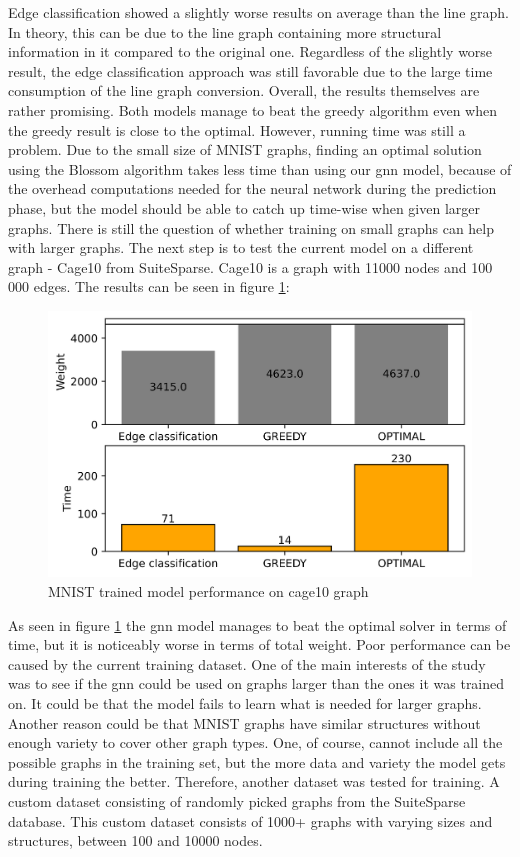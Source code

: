 Edge classification showed a slightly worse results on average than the line graph. In theory, this can be due to the line graph containing more structural information in it compared to the original one. Regardless of the slightly worse result, the edge classification approach was still favorable due to the large time consumption of the line graph conversion. Overall, the results themselves are rather promising. Both models manage to beat the greedy algorithm even when the greedy result is close to the optimal. However, running time was still a problem. Due to the small size of MNIST graphs, finding an optimal solution using the Blossom algorithm takes less time than using our \gls{gnn} model, because of the overhead computations needed for the neural network during the prediction phase, but the model should be able to catch up time-wise when given larger graphs. There is still the question of whether training on small graphs can help with larger graphs. The next step is to test the current model on a different graph - Cage10 from SuiteSparse. Cage10 is a graph with 11000 nodes and 100 000 edges. The results can be seen in figure \ref{model performance}:

\begin{figure}[H]
    \centering
    \includegraphics[scale=1.0]{figures/MNISTtrainCAGE10}
    \caption{MNIST trained model performance on cage10 graph}
    \label{model performance}
\end{figure}

As seen in figure \ref{model performance} the \gls{gnn} model manages to beat the optimal solver in terms of time, but it is noticeably worse in terms of total weight. Poor performance can be caused by the current training dataset. One of the main interests of the study was to see if the \gls{gnn} could be used on graphs larger than the ones it was trained on. It could be that the model fails to learn what is needed for larger graphs. Another reason could be that MNIST graphs have similar structures without enough variety to cover other graph types. One, of course, cannot include all the possible graphs in the training set, but the more data and variety the model gets during training the better. Therefore, another dataset was tested for training. A custom dataset consisting of randomly picked graphs from the SuiteSparse database. This custom dataset consists of 1000+ graphs with varying sizes and structures, between 100 and 10000 nodes.

